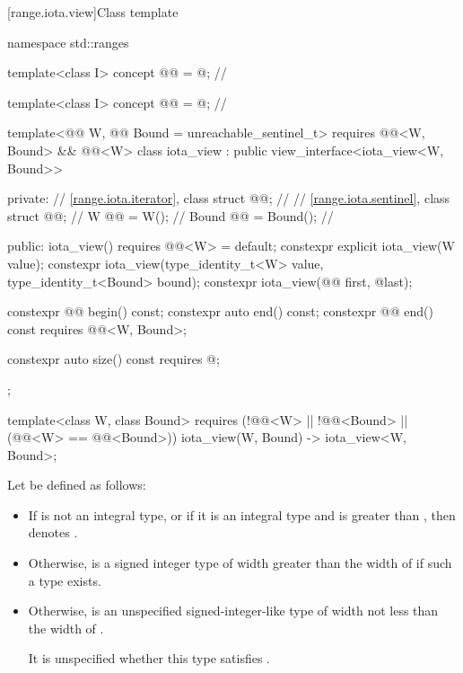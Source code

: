 [range.iota.view]{Class template }

%
\begin{codeblock}
namespace std::ranges {
  template<class I>
    concept @@ = @\seebelownc@;  // \expos

  template<class I>
    concept @@ = @\seebelownc@;    // \expos

  template<@@ W, @@ Bound = unreachable_sentinel_t>
    requires @@<W, Bound> && @@<W>
  class iota_view : public view_interface<iota_view<W, Bound>> {
  private:
    // \ref{range.iota.iterator}, class 
    struct @@;                    // \expos
    // \ref{range.iota.sentinel}, class 
    struct @@;                    // \expos
    W @@ = W();                     // \expos
    Bound @@ = Bound();             // \expos

  public:
    iota_view() requires @@<W> = default;
    constexpr explicit iota_view(W value);
    constexpr iota_view(type_identity_t<W> value, type_identity_t<Bound> bound);
    constexpr iota_view(@@ first, @\seebelow@ last);

    constexpr @@ begin() const;
    constexpr auto end() const;
    constexpr @@ end() const requires @@<W, Bound>;

    constexpr auto size() const requires @\seebelow@;
  };

  template<class W, class Bound>
    requires (!@@<W> || !@@<Bound> ||
              (@@<W> == @@<Bound>))
    iota_view(W, Bound) -> iota_view<W, Bound>;
}
\end{codeblock}

\pnum
Let  be defined as follows:
\begin{itemize}
\item
  If  is not an integral type, or
  if it is an integral type and 
  is greater than ,
  then  denotes .
\item
  Otherwise, 
  is a signed integer type of width greater than the width of 
  if such a type exists.
\item
  Otherwise, 
  is an unspecified signed-integer-like type
  of width not less than the width of .
  \begin{note}
  It is unspecified
  whether this type satisfies .
  \end{note}
\end{itemize}

